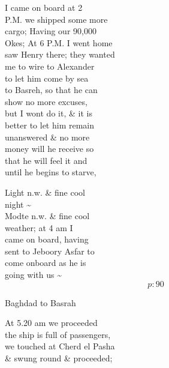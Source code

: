 \documentclass{report}
\begin{document}

	\par{
 	I came on board at 2\ \\P.M. we shipped some more\ \\cargo; Having our 90,000\ \\Okes; At 6 P.M. I went home\ \\saw Henry there; they wanted\ \\me to wire to Alexander\ \\to let him come by sea\ \\to Basreh, so that he can\ \\show no more excuses,\ \\but I wont do it, \& it is\ \\better to let him remain\ \\unanswered \& no more\ \\money will he receive so\ \\that he will feel it and\ \\until he begins to starve,\ \\
	}

	\par{
 	Light n.w. \& fine cool\ \\night \~{}\ \\Modte n.w. \& fine cool\ \\weather; at 4 am I\ \\came on board, having\ \\sent to Jeboory Asfar to\ \\come onboard as he is\ \\going with us \~{}\ \\
  \[p: 90 \]

	}







	\par{
 	Baghdad to Basrah\ \\
	}

	\par{
 	At 5.20 am we proceeded\ \\the ship is full of passengers,\ \\we touched at Cherd el Pasha\ \\\& swung round \& proceeded;\ \\
	}
\end{document}
